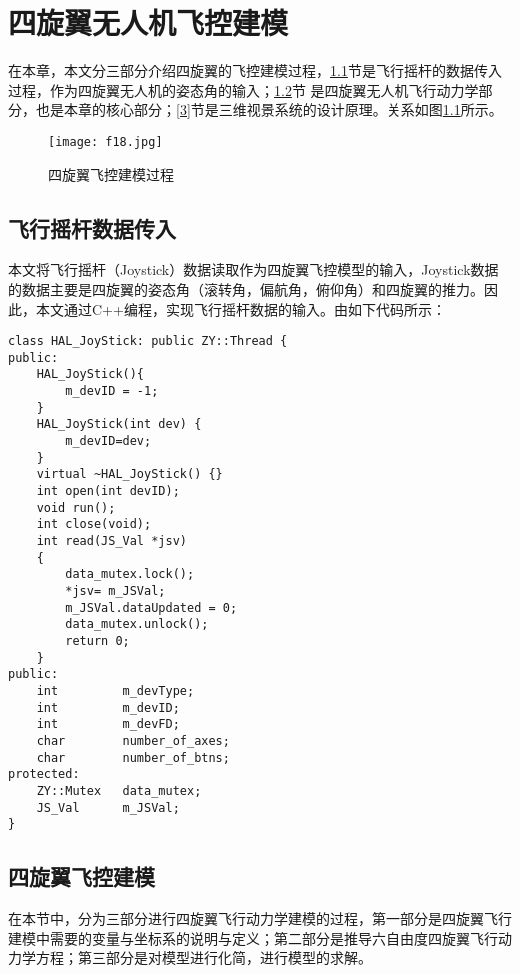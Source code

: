 ﻿\chapter{四旋翼无人机飞控建模}\label{le}
在本章，本文分三部分介绍四旋翼的飞控建模过程，\ref{1}节是飞行摇杆的数据传入过程，作为四旋翼无人机的姿态角的输入；\ref{2}节 是四旋翼无人机飞行动力学部分，也是本章的核心部分；\ref{3}节是三维视景系统的设计原理。关系如图\ref{fig17}所示。
\vspace{-10pt}
\begin{figure}[!ht]
\centering
\texttt{[image: f18.jpg]}
\caption{四旋翼飞控建模过程}
\label{fig17}
\end{figure}
\vspace{-10pt}
\section{飞行摇杆数据传入}\label{1}
  本文将飞行摇杆（Joystick）数据读取作为四旋翼飞控模型的输入，Joystick数据的数据主要是四旋翼的姿态角（滚转角，偏航角，俯仰角）和四旋翼的推力。因此，本文通过C++编程，实现飞行摇杆数据的输入。由如下代码所示：

 \begin{lstlisting}[language={[ANSI]C++}]
class HAL_JoyStick: public ZY::Thread {
public:
    HAL_JoyStick(){
        m_devID = -1;
    }
    HAL_JoyStick(int dev) {
        m_devID=dev;
    }
    virtual ~HAL_JoyStick() {}
    int open(int devID);
    void run();
    int close(void);
    int read(JS_Val *jsv)
    {
        data_mutex.lock();
        *jsv= m_JSVal;
        m_JSVal.dataUpdated = 0;
        data_mutex.unlock();
        return 0;
    }
public:
    int         m_devType;
    int         m_devID;
    int         m_devFD;
    char        number_of_axes;
    char        number_of_btns;
protected:
    ZY::Mutex   data_mutex;
    JS_Val      m_JSVal;
}
\end{lstlisting}

\section{四旋翼飞控建模}\label{2}
在本节中，分为三部分进行四旋翼飞行动力学建模的过程，第一部分是四旋翼飞行建模中需要的变量与坐标系的说明与定义；第二部分是推导六自由度四旋翼飞行动力学方程；第三部分是对模型进行化简，进行模型的求解。
